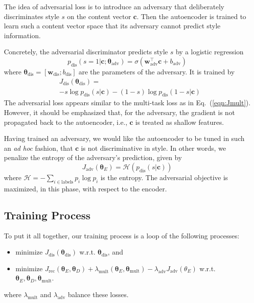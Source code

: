\documentclass[11pt,a4paper]{article}
\newcommand{\loss}[1]{J_\text{#1}}
\begin{document}
The idea of adversarial loss is to introduce an adversary that deliberately discriminates style $s$ on the content vector $\bm c$. Then the autoencoder is trained to learn such a content vector space that its adversary cannot predict style information.

Concretely, the adversarial discriminator predicts style $s$ by a logistic regression
\begin{equation}
	p_\text{dis}(s=1|\bm c;\bm\theta_\text{adv})=\sigma(\bm w_\text{adv}^\top \bm c + b_\text{adv})
\end{equation}
where $\bm\theta_\text{dis}=[\bm w_\text{dis}; b_\text{dis}]$ are the parameters of the adversary. It is trained by
\begin{align}
	 & \loss{dis}(\bm\theta_\text{dis})=                              \\ \nonumber
	 & -s\log p_\text{dis}(s|\bm c)-(1-s)\log p_\text{dis}(1-s|\bm c)
\end{align}
The adversarial loss appears similar to the multi-task loss as in Eq.~(\ref{eqn:Jmult}). However, it should be emphasized that, for the adversary, the gradient is not propagated back to the autoencoder, i.e., $\bm c$ is treated as shallow features.

Having trained an adversary, we would like the autoencoder to be tuned in such an \textit{ad hoc} fashion, that $\bm c$ is not discriminative in style. In other words, we penalize the entropy of the adversary's prediction, given by
\begin{equation}
	\loss{adv}(\bm\theta_E)=\mathcal{H}(p_\text{dis}(s|\bm c))
\end{equation}
where $\mathcal{H}=-\sum_{i\in\text{labels}}p_i\log p_i$ is the entropy. The adversarial objective is maximized, in this phase, with respect to the encoder.



\subsection{Training Process}

To put it all together, our training process is a loop of the following processes:
\begin{itemize}
	\item minimize $\loss{dis}(\bm\theta_\text{dis})$ w.r.t. $\bm\theta_\text{dis}$, and
	\item minimize $\loss{rec}(\bm\theta_E, \bm\theta_D) + \lambda_\text{mult}(\bm\theta_E,\bm\theta_\text{mult}) -\lambda_\text{adv}
		      \loss{adv}(\theta_E)$ w.r.t. $\bm\theta_E, \bm\theta_D, \bm\theta_\text{mult}$.
\end{itemize}
where $\lambda_\text{mult}$ and $\lambda_\text{adv}$ balance these losses.
\end{document}

